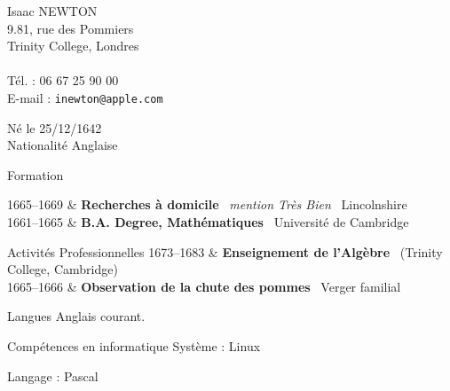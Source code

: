 \documentclass{cv}
\newcommand{\lieu}[1]{{#1}\ }
\newcommand{\activite}[1]{\textbf{#1}\ }
\newcommand{\comment}[1]{\textsl{#1}\ }
\begin{document}
\begin{chapeau}
\begin{adresse}
	Isaac NEWTON\\%
	9.81, rue des Pommiers\\%
	Trinity College, Londres\\%
	\ligne\\%
	Tél. : 06 67 25 90 00\\%
	E-mail : \texttt{inewton@apple.com}
\end{adresse}
\begin{etatcivil}
	Né le 25/12/1642\\
	Nationalité Anglaise
\end{etatcivil}
\end{chapeau}




\begin{rubriquetableau}[3.5cm]{Formation}

1665--1669 
	& \activite{Recherches à domicile}
	\comment{mention Très Bien}
	\lieu{Lincolnshire}\\

1661--1665 
	& \activite{B.A. Degree, Mathématiques}
	\lieu{Université de Cambridge}\\

\end{rubriquetableau}

\begin{rubriquetableau}[3.5cm]{Activités Professionnelles}
1673--1683
        & \activite{Enseignement de l'Algèbre}
        \lieu{(Trinity College, Cambridge)}\\
1665--1666
	& \activite{Observation de la chute des pommes}
	\lieu{Verger familial}\\


\end{rubriquetableau}

\begin{rubrique}{Langues} 
Anglais courant.
\end{rubrique}

\begin{rubrique}{Compétences en informatique}%
Système : Linux

Langage : Pascal
\end{rubrique}
\end{document}
